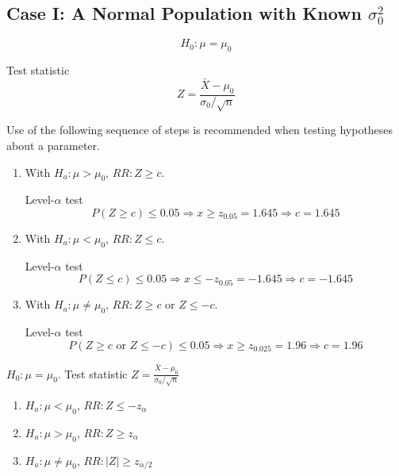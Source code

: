 \subsection{Case I: A Normal Population with Known $\sigma_0^2$}
\[H_0:\mu=\mu_0\]

Test statistic 
\[Z=\frac{\bar{X}-\mu_0}{\sigma_0/\sqrt{n}}\]

Use of the following sequence of steps is recommended when testing hypotheses
about a parameter.
\begin{enumerate}
\item With $H_a: \mu>\mu_0$, $RR:Z\geq c$.

Level-$\alpha$ test
\[P(Z\geq c)\leq 0.05 \Rightarrow x \geq z_{0.05}=1.645 \Rightarrow c=1.645\]
\item With $H_a: \mu<\mu_0$, $RR:Z\leq c$.

Level-$\alpha$ test
\[P(Z\leq c)\leq 0.05 \Rightarrow x \leq -z_{0.05}=-1.645 \Rightarrow c=-1.645\]
\item With $H_a: \mu\neq\mu_0$, $RR:Z\geq c$ or $Z \leq -c$.

Level-$\alpha$ test
\[P(Z\geq c \text{ or } Z \leq -c)\leq 0.05 \Rightarrow x \geq z_{0.025}=1.96 \Rightarrow c=1.96\]
\end{enumerate}

\begin{mdframed}[style=exampledefault,frametitle={Conclusion}]
	$H_0:\mu=\mu_0$. Test statistic $Z=\frac{\bar{X}-\mu_0}{\sigma_0/\sqrt{n}}$
	\begin{enumerate}
	\item $H_a:\mu < \mu_0$, $RR: Z\leq -z_{\alpha}$
	\item $H_a:\mu > \mu_0$, $RR: Z\geq z_{\alpha}$
	\item $H_a:\mu \neq \mu_0$, $RR: |Z|\geq z_{\alpha/2}$ 
	\end{enumerate}
\end{mdframed}

%	


